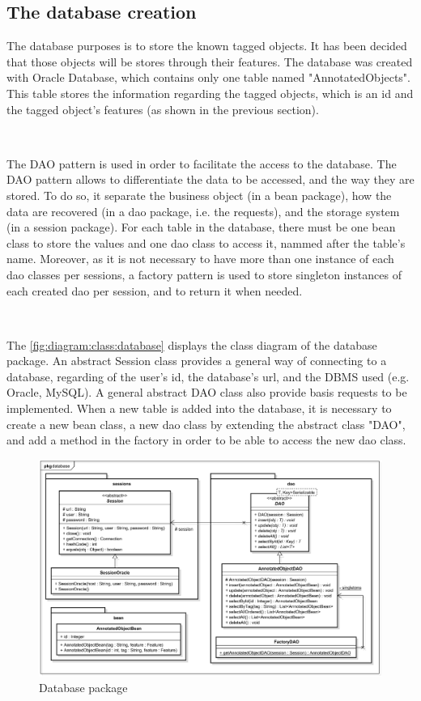 \subsection{The database creation}

The database purposes is to store the known tagged objects. It has been decided that those objects will be stores through their features. The database was created with Oracle Database, which contains only one table named "AnnotatedObjects". This table stores the information regarding the tagged objects, which is an id and the tagged object's features (as shown in the previous section).

~~

The \gls{DAO} pattern is used in order to facilitate the access to the database. The \gls{DAO} pattern allows to differentiate the data to be accessed, and the way they are stored. To do so, it separate the business object (in a bean package), how the data are recovered (in a dao package, i.e. the requests), and the storage system (in a session package). For each table in the database, there must be one bean class to store the values and one dao class to access it, nammed after the table's name. Moreover, as it is not necessary to have more than one instance of each dao classes per sessions, a factory pattern is used to store singleton instances of each created dao per session, and to return it when needed.

~~


The \vref{fig:diagram:class:database} displays the class diagram of the database package. An abstract Session class provides a general way of connecting to a database, regarding of the user's id, the database's url, and the \gls{DBMS} used (e.g. Oracle, MySQL). A general abstract DAO class also provide basis requests to be implemented. When a new table is added into the database, it is necessary to create a new bean class, a new dao class by extending the abstract class "DAO", and add a method in the factory in order to be able to access the new dao class.






\begin{figure}[h]
	\centering 
	\includegraphics[width=1\textwidth]{images/diagrams/class_diagram_database}
	\caption{Database package}
	\label{fig:diagram:class:database}
\end{figure}


